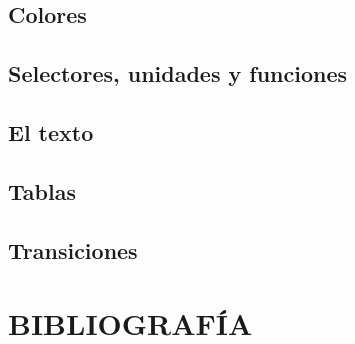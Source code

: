 \documentclass{beamer}
\begin{document}
	\subsection{Colores}
	\subsection{Selectores, unidades y funciones}
	\subsection{El texto}
	\subsection{Tablas}
	\subsection{Transiciones}
	
\section{BIBLIOGRAFÍA}
\end{document}
